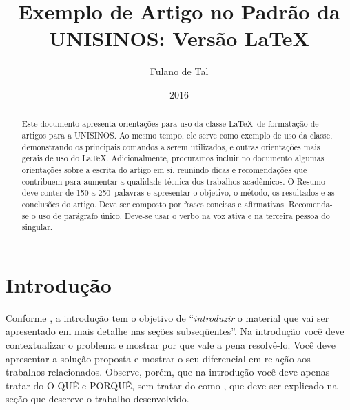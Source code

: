 \documentclass[twoside,english,brazilian]{UNISINOSartigo}
\title{Exemplo de Artigo no Padrão da UNISINOS: Versão \LaTeX}
\author{Fulano de Tal}
\date{2016}
\begin{document}
\maketitle

%
\begin{abstract}
Este documento apresenta orientações para uso da classe \LaTeX\ de formatação de artigos para a UNISINOS\@.  Ao mesmo tempo, ele serve como exemplo de uso da classe, demonstrando os principais comandos a serem utilizados, e outras orientações mais gerais de uso do \LaTeX.  Adicionalmente, procuramos incluir no documento algumas orientações sobre a escrita do artigo em si, reunindo dicas e recomendações que contribuem para aumentar a qualidade técnica dos trabalhos acadêmicos.  O Resumo deve conter de 150 a 250~palavras e apresentar o objetivo, o método, os resultados e as conclusões do artigo. Deve ser composto por frases concisas e afirmativas. Recomenda-se o uso de parágrafo único. Deve-se usar o verbo na voz ativa e na terceira pessoa do singular.
\end{abstract}

\section{Introdução}

Conforme , a introdução tem o objetivo de ``\emph{introduzir} o material que vai ser apresentado em mais detalhe nas seções subseqüentes''. Na introdução você deve contextualizar o problema e mostrar por que vale a pena resolvê-lo. Você deve apresentar a solução proposta e mostrar o seu diferencial em relação aos trabalhos relacionados. Observe, porém, que na introdução você deve apenas tratar do O QUÊ e PORQUÊ, sem tratar do como \cite{Hexsel11}, que deve ser explicado na seção que descreve o trabalho desenvolvido.
\end{document}
